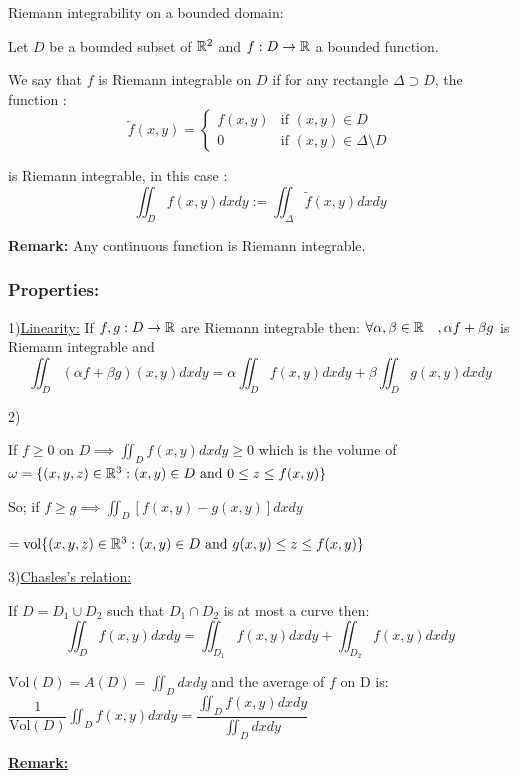 \begin{definition}
  Riemann integrability on a bounded domain:

  Let $D$ be a bounded subset of $\mathbb{R}^2$ and $ f: D \to \mathbb{R} $ a bounded function.

  We say that $f$ is Riemann integrable on $D$ if for any rectangle $\Delta \supset D$, the function :
  \[
    \tilde{f}(x,y) = 
    \begin{cases}
      f(x,y) & \text{if } (x,y) \in D \\
      0 & \text{if } (x,y) \in \Delta \setminus D
    \end{cases}
  \]

  is Riemann integrable, in this case :
  \[ \iint_D f(x,y)dxdy := \iint_{\Delta} \tilde{f}(x,y) dxdy\]

\textbf{Remark:}
Any continuous function is Riemann integrable.

\subsubsection{Properties:}

1)\underline{Linearity:}
If $f,g: D \to \mathbb{R}$ are Riemann integrable then:
$\forall \alpha,\beta \in \mathbb{R} \quad, \alpha f + \beta g$ is Riemann integrable and 
\[\iint_D(\alpha f + \beta g)(x,y)dxdy = \alpha\iint_Df(x,y)dxdy + \beta\iint_Dg(x,y)dxdy \]

2)

If $f \ge 0$ on $D \implies \iint_D f(x,y) dxdy \ge 0$
which is the volume of $\omega = \{(x,y,z) \in \mathbb{R}^3 : (x,y)\in D \text{ and } 0 \le z \le f(x,y)\}$

So; if $f \ge g \implies \iint_D\left[f(x,y) - g(x,y)\right]dxdy$

$= \text{vol}\{(x,y,z) \in \mathbb{R}^3: (x,y) \in D \text{ and } g(x,y) \le z \le f(x,y)\}$ 

3)\underline{Chasles's relation:}

If $D = D_1 \cup D_2$ such that $D_1 \cap D_2$ is at most a curve then:
\[\iint_Df(x,y)dxdy = \iint_{D_1}f(x,y)dxdy + \iint_{D_2}f(x,y)dxdy \]
\end{definition}

\begin{definition}
  $\text{Vol}(D) = A(D) = \iint_Ddxdy$ \quad and the average of $f$ on D is:
  $\dfrac{1}{\text{Vol}(D)}\iint_Df(x,y)dxdy = \dfrac{\iint_Df(x,y)dxdy }{\iint_D dxdy }$
\end{definition}

\textbf{\underline{Remark:}}

